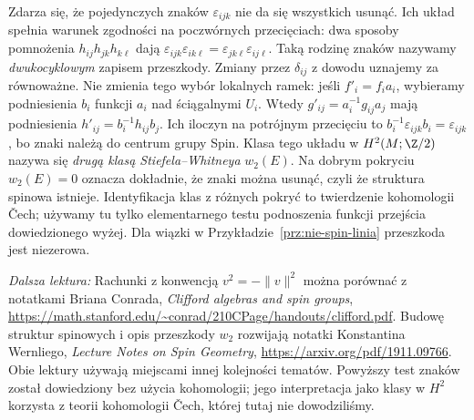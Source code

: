 \begin{uwaga}
Zdarza się, że pojedynczych znaków
$\varepsilon_{ijk}$ nie da się wszystkich
usunąć. Ich układ spełnia warunek zgodności
na poczwórnych przecięciach: dwa sposoby
pomnożenia $h_{ij}h_{jk}h_{k\ell}$
dają
$\varepsilon_{ijk}\varepsilon_{ik\ell}
=\varepsilon_{jk\ell}\varepsilon_{ij\ell}$.
Taką rodzinę znaków nazywamy
\emph{dwukocyklowym} zapisem przeszkody.
Zmiany przez $\delta_{ij}$ z dowodu
uznajemy za równoważne. Nie zmienia tego wybór lokalnych ramek:
jeśli $f'_i=f_i a_i$, wybieramy podniesienia $b_i$ funkcji $a_i$
nad ściągalnymi $U_i$. Wtedy $g'_{ij}=a_i^{-1}g_{ij}a_j$
mają podniesienia $h'_{ij}=b_i^{-1}h_{ij}b_j$.
Ich iloczyn na potrójnym przecięciu to
$b_i^{-1}\varepsilon_{ijk}b_i=\varepsilon_{ijk}$,
bo znaki należą do centrum grupy Spin.
Klasa tego układu w
$H^2(M;\Z/2)$ nazywa się
\emph{drugą klasą Stiefela--Whitneya}
$w_2(E)$. Na dobrym pokryciu
$w_2(E)=0$ oznacza dokładnie, że znaki
można usunąć, czyli że struktura spinowa
istnieje. Identyfikacja klas z różnych
pokryć to twierdzenie kohomologii Čech;
używamy tu tylko elementarnego testu
podnoszenia funkcji przejścia dowiedzionego
wyżej. Dla wiązki w
Przykładzie~\ref{prz:nie-spin-linia}
przeszkoda jest niezerowa.
\end{uwaga}

\par\smallskip
{\footnotesize\noindent\emph{Dalsza lektura:}
Rachunki z konwencją $v^2=-\|v\|^2$
można porównać z notatkami Briana Conrada,
\emph{Clifford algebras and spin groups},
\url{https://math.stanford.edu/~conrad/210CPage/handouts/clifford.pdf}.
Budowę struktur spinowych i opis przeszkody
$w_2$ rozwijają notatki Konstantina Wernliego,
\emph{Lecture Notes on Spin Geometry},
\url{https://arxiv.org/pdf/1911.09766}.
Obie lektury używają miejscami innej kolejności tematów.
Powyższy test znaków został dowiedziony bez użycia kohomologii;
jego interpretacja jako klasy w $H^2$ korzysta z teorii
kohomologii Čech, której tutaj nie dowodziliśmy.\par}
\clearpage
